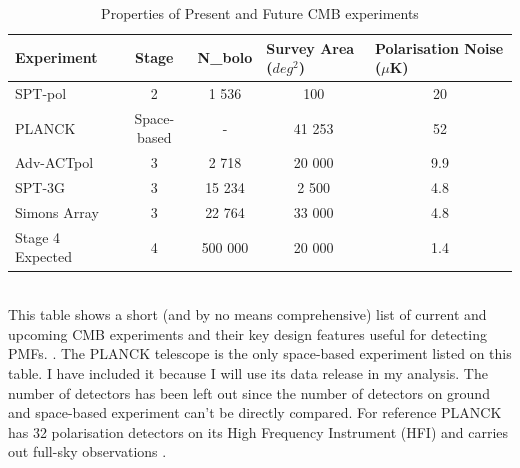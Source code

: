\begin{table}[b]
\centering
\caption{Properties of Present and Future CMB experiments}
\label{my-label}
\begin{tabular}{l|l|l|l|l}
Experiment & \multicolumn{1}{c|}{Stage} & \multicolumn{1}{c|}{N_{bolo}} & Survey Area ($deg^{2}$)& Polarisation Noise ($\mu$K) \\ \hline
SPT-pol & \multicolumn{1}{c|}{2} & \multicolumn{1}{c|}{1 536} & \multicolumn{1}{c|}{100} & \multicolumn{1}{c}{20} \\
PLANCK & \multicolumn{1}{c|}{Space-based} & \multicolumn{1}{c|}{-} & \multicolumn{1}{c|}{41 253} & \multicolumn{1}{c}{52} \\
Adv-ACTpol & \multicolumn{1}{c|}{3} & \multicolumn{1}{c|}{2 718} & \multicolumn{1}{c|}{20 000} & \multicolumn{1}{c}{9.9} \\
SPT-3G & \multicolumn{1}{c|}{3} & \multicolumn{1}{c|}{15 234} & \multicolumn{1}{c|}{2 500} & \multicolumn{1}{c}{4.8} \\
Simons Array & \multicolumn{1}{c|}{3} & \multicolumn{1}{c|}{22 764} & \multicolumn{1}{c|}{33 000} & \multicolumn{1}{c}{4.8} \\ 
Stage 4 Expected & \multicolumn{1}{c|}{4} & \multicolumn{1}{c|}{500 000} & \multicolumn{1}{c|}{20 000} & \multicolumn{1}{c}{1.4} \\
\end{tabular}
\bigskip
\\This table shows a short (and by no means comprehensive) list of current and upcoming CMB experiments and their key design features useful for detecting PMFs. \cite{Henderson:2015nzj} \cite{Benson:2014qhw} \cite{Suzuki:2015zzg} \cite{Adam:2015vua}. The PLANCK telescope is the only space-based experiment listed on this table. I have included it because I will use its data release in my analysis. The number of detectors has been left out since the number of detectors on ground and space-based experiment can't be directly compared. For reference PLANCK has 32 polarisation detectors on its High Frequency Instrument (HFI) and carries out full-sky observations \cite{Lamarre:2003zh}.
\end{table}
